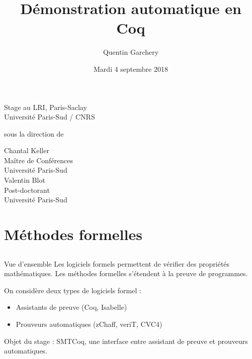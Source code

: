 \documentclass{beamer}
\title[Audition]{Démonstration automatique en Coq}
\author{Quentin Garchery}
\date{Mardi 4 septembre 2018}
\begin{document}
\begin{frame}
\begin{center}
\maketitle
\normalsize{Stage au LRI, Paris-Saclay\\
Université Paris-Sud / CNRS }
\vspace{1mm}

\scriptsize sous la direction de \\

\vspace{1mm}

\begin{multicols}{2}
\normalsize Chantal Keller \\
\scriptsize Maître de Conférences\\
Université Paris-Sud \\

\normalsize Valentin Blot \\
\scriptsize Post-doctorant\\
Université Paris-Sud
\end{multicols}

\end{center}
\end{frame}



\section{Méthodes formelles}

\subsection{}
\begin{frame}{Vue d'ensemble}
Les logiciels formels permettent de vérifier des propriétés mathématiques. Les méthodes formelles s'étendent à la preuve de programmes. 

\vspace{1cm}

On considère deux types de logiciels formel :
\begin{itemize}
    \item Assistants de preuve (Coq, Isabelle) 
    \item Prouveurs automatiques (zChaff, veriT, CVC4)

\end{itemize}

\vspace{1cm}
Objet du stage : SMTCoq, une interface entre assistant de preuve et prouveurs automatiques.

\end{frame}
\end{document}
